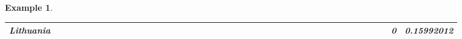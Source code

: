 \documentclass[a4paper,11pt]{report}
\newtheorem{example}[theorem]{Example}
\begin{document}
\begin{example}
\begin{appendices}
\begin{landscape}
\begin{longtable}{r|r|r|r|r|r|r|r|r|r|r|r|r|r|r|r|r|r|r|r|r|r|r|r|r|r|r|r|r|r|r|r|r|r|r|r|r|r|r|r|r|r|}
\multicolumn{1}{|r|}{\textbf{Lithuania}}       &                                       &                                       &                                       &                                          &                                       &                                       &                                       &                                       &                                                &                                       &                                      &                                       &                                       &                                      &                                       &                                       &                                       &                                      &                                     &                                      &                                         &                                     &                                       &                                          &                                      &                                      &                                        &                                       &                                      &                                          &                                        &                                     &                                      &                                           &                                               &                                       &                                              &                                      &                                     & 0                                             & 0.15992012                              \\ \hline

\end{longtable}
\end{landscape}
\end{appendices}
\end{example}
\end{document}
